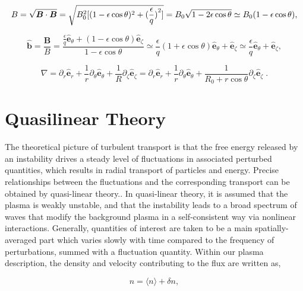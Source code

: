 \documentclass[12pt]{article}
\numberwithin{equation}{section}
\begin{document}
   \begin{equation}
      B = \sqrt{\bm{B}\cdot\bm{B}} = \sqrt{B_0^2[(1-\epsilon\cos\theta)^2 + (\frac{\epsilon}{q})\strut^2]} =
          B_0\sqrt{1-2\epsilon\cos\theta} \simeq B_0(1-\epsilon\cos\theta),
   \end{equation}

   \begin{equation}
      \bm{\hat{b}} = \frac{\bm{B}}{B} = \frac{\frac{\epsilon}{q}\bm{\hat{e}}_\theta + (1-\epsilon\cos\theta)\bm{\hat{e}}_\zeta}
                     {1-\epsilon\cos\theta} \simeq \frac{\epsilon}{q}(1+\epsilon\cos\theta)\bm{\hat{e}}_\theta + 
                     \bm{\hat{e}}_\zeta \simeq \frac{\epsilon}{q}\bm{\hat{e}}_\theta + \bm{\hat{e}}_\zeta,
   \end{equation}

   \begin{equation}
      \nabla = \partial_r\bm{\hat{e}}_r + \frac{1}{r}\partial_\theta\bm{\hat{e}}_\theta +
               \frac{1}{R}\partial_\zeta\bm{\hat{e}}_\zeta = \partial_r\bm{\hat{e}}_r   +
               \frac{1}{r}\partial_\theta\bm{\hat{e}}_\theta + \frac{1}{R_0 + r\cos\theta}\partial_\zeta\bm{\hat{e}}_\zeta\;.
   \end{equation}


\section{Quasilinear Theory}
   \quad The theoretical picture of turbulent transport is that the free energy released by an instability drives a steady level of
fluctuations in associated perturbed quantities, which results in radial transport of particles and energy. Precise relationships
between the fluctuations and the corresponding transport can be obtained by quasi-linear theory.\cite{WessonC}. In quasi-linear
theory, it is assumed that the plasma is weakly unstable, and that the instability leads to a broad spectrum of waves that modify
the background plasma in a self-consistent way via nonlinear interactions\cite{GurnBhatA}. Generally, quantities of interest are taken to be a main
spatially-averaged part which varies slowly with time compared to the frequency of perturbations, summed with a fluctuation quantity.
Within our plasma description, the density and velocity contributing to the flux are written as,
   
   \begin{equation}
      n = \langle n \rangle + \delta n,
   \end{equation}
\end{document}
